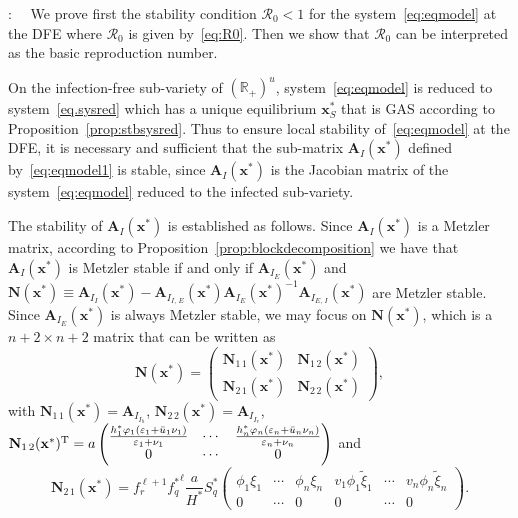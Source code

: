 \documentclass[a4paper]{article}
\begin{document}
:~~
We prove first the stability condition $\mathcal R_0 < 1$ for the system~\eqref{eq:eqmodel} at the DFE where $\mathcal R_0$ is given by~\eqref{eq:R0}. Then we show that $\mathcal R_0$ can be interpreted as the basic reproduction number. 

On the infection-free sub-variety of $\left(\mathbb R_+\right)^u$, system~\eqref{eq:eqmodel} is reduced to system~\eqref{eq.sysred} which  has a unique equilibrium $\mathbf x^*_S$ that is GAS according to Proposition~\ref{prop:stbsysred}. Thus to ensure local stability of~\eqref{eq:eqmodel} at the DFE, it is necessary and sufficient that  the sub-matrix $\mathbf A_I(\mathbf x^*)$ defined by~\eqref{eq:eqmodel1} is stable, since  $\mathbf A_I(\mathbf x^*)$ is the Jacobian matrix of the system~\eqref{eq:eqmodel} reduced to the infected sub-variety. 

\noindent The stability of $\mathbf A_I(\mathbf x^*)$ is established as follows. Since  $\mathbf A_I(\mathbf x^*)$ is a Metzler  matrix, according to Proposition~\ref{prop:blockdecomposition}  we have that $\mathbf A_I(\mathbf x^*)$ is Metzler stable if and only if  $\mathbf A_{I_E}(\mathbf x^*)$ and $\mathbf N(\mathbf x^*) \equiv \mathbf A_{I_I}(\mathbf x^*) - \mathbf A_{I_{I,\,E}}(\mathbf x^*){\mathbf A_{I_E}(\mathbf x^*)}^{-1}\mathbf A_{I_{E,\,I}}(\mathbf x^*)$ are Metzler stable. Since $\mathbf A_{I_E}(\mathbf x^*)$ is always Metzler stable, we may focus on $\mathbf N(\mathbf x^*)$, which is a $n+2\times n+ 2$ matrix that can be written as 
$$\mathbf N(\mathbf x^*)=\left(\begin{array}{cc} \mathbf N_{1\,1}(\mathbf x^*)&\mathbf N_{1\,2}(\mathbf x^*)\\\mathbf N_{2\,1}(\mathbf x^*)&\mathbf N_{2\,2}(\mathbf x^*) \end{array}\right),$$ 
with
$\mathbf N_{1\,1}(\mathbf x^*)=\mathbf A_{I_{I_h}}$, $\mathbf N_{2\,2}(\mathbf x^*)=\mathbf A_{I_{I_v}}$,
%
$\mathbf N_{1\,2}(\mathbf x^*)^{\mathrm T}=a\begin{pmatrix}
\frac{h_1^*\varphi_1(\varepsilon_1+\bar u_1\nu_1)}{\varepsilon_1+\nu_1} & \cdots & \frac{h_n^*\varphi_n(\varepsilon_n+\bar u_n\nu_n)}{\varepsilon_n+\nu_n}\cr 0&\cdots & 0
\end{pmatrix}$  and $$\mathbf N_{2\,1}(\mathbf x^*)=f_r^{\ell+1}{f_q^*}^\ell\dfrac{a}{H^*}S_q^*\begin{pmatrix}\phi_{1} \xi_{1} &  \cdots &  \phi_{n}  \xi_{n} &v_1\phi_{1}  \widetilde\xi_{1}   & \cdots & v_n\phi_{n} \widetilde\xi_{n}   \\
0 &  \cdots & 0 & 0 &  \cdots & 0 \end{pmatrix}.$$
\end{document}
